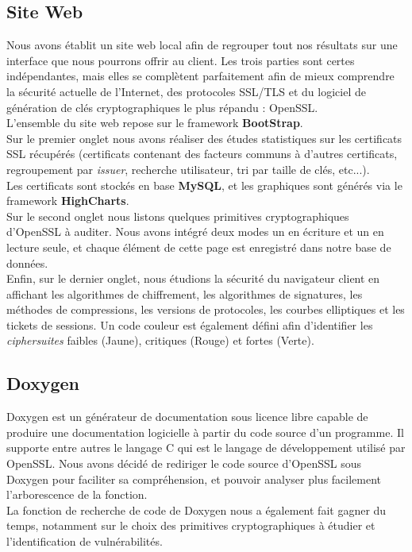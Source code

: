 \subsection{Site Web}

Nous avons établit un site web local afin de regrouper tout nos résultats sur une interface que nous pourrons offrir au client. Les trois parties sont certes indépendantes, mais elles se complètent parfaitement afin de mieux comprendre la sécurité actuelle de l'Internet, des protocoles SSL/TLS et du logiciel de génération de clés cryptographiques le plus répandu : OpenSSL.\\
L'ensemble du site web repose sur le framework \textbf{BootStrap}.\\

Sur le premier onglet nous avons réaliser des études statistiques sur les certificats SSL récupérés (certificats contenant des facteurs communs à d'autres certificats, regroupement par \textit{issuer}, recherche utilisateur, tri par taille de clés, etc...).\\
Les certificats sont stockés en base \textbf{MySQL}, et les graphiques sont générés via le framework \textbf{HighCharts}.\\

Sur le second onglet nous listons quelques primitives cryptographiques d'OpenSSL à auditer. Nous avons intégré deux modes un en écriture et un en lecture seule, et chaque élément de cette page est enregistré dans notre base de données.\\

Enfin, sur le dernier onglet, nous étudions la sécurité du navigateur client en affichant les algorithmes de chiffrement, les algorithmes de signatures, les méthodes de compressions, les versions de protocoles, les courbes elliptiques et les tickets de sessions. Un code couleur est également défini afin d'identifier les \textit{ciphersuites} faibles (Jaune), critiques (Rouge) et fortes (Verte).

\subsection{Doxygen}

Doxygen est un générateur de documentation sous licence libre capable de produire une documentation logicielle à partir du code source d'un programme. Il supporte entre autres le langage C qui est le langage de développement utilisé par OpenSSL. Nous avons décidé de rediriger le code source d'OpenSSL sous Doxygen pour faciliter sa compréhension, et pouvoir analyser plus facilement l'arborescence de la fonction.\\
La fonction de recherche de code de Doxygen nous a également fait gagner du temps, notamment sur le choix des primitives cryptographiques à étudier et l'identification de vulnérabilités.\\

